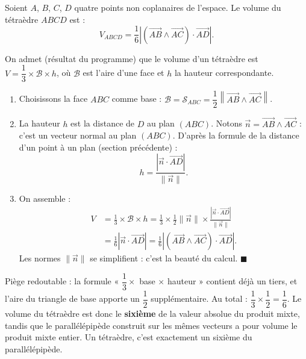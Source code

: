 \documentclass[11pt]{article}
\newcounter{popsec}
\newcounter{popsub}
\newcommand{\courssub}[1]{%
  \stepcounter{popsub}%
  \par\vspace{9pt}\noindent{\popxbold\fontsize{11.5}{13}\selectfont\color{popink}{\color{poporange}\thepopsec.\thepopsub}\hspace{6pt}#1}\par\nopagebreak\vspace{4pt}
}
\begin{document}
\courssub{Volume du tétraèdre}

\begin{propriete}
Soient $A$, $B$, $C$, $D$ quatre points non coplanaires de l'espace. Le volume du tétraèdre $ABCD$ est :
\[ V_{ABCD} = \frac{1}{6} \left| \left( \overrightarrow{AB} \wedge \overrightarrow{AC} \right) \cdot \overrightarrow{AD} \right|. \]
\end{propriete}

\begin{experience}[Démonstration guidée : $V = \dfrac{1}{3} \times \text{aire de base} \times \text{hauteur}$]
On admet (résultat du programme) que le volume d'un tétraèdre est $V = \dfrac{1}{3} \times \mathcal{B} \times h$, où $\mathcal{B}$ est l'aire d'une face et $h$ la hauteur correspondante.
\begin{enumerate}
\item Choisissons la face $ABC$ comme base : $\mathcal{B} = \mathcal{S}_{ABC} = \dfrac{1}{2} \left\| \overrightarrow{AB} \wedge \overrightarrow{AC} \right\|$.
\item La hauteur $h$ est la distance de $D$ au plan $(ABC)$. Notons $\vec{n} = \overrightarrow{AB} \wedge \overrightarrow{AC}$ : c'est un vecteur normal au plan $(ABC)$. D'après la formule de la distance d'un point à un plan (section précédente) :
\[ h = \frac{\left| \vec{n} \cdot \overrightarrow{AD} \right|}{\|\vec{n}\|}. \]
\item On assemble :
\begin{align*}
V &= \frac{1}{3} \times \mathcal{B} \times h = \frac{1}{3} \times \frac{1}{2}\|\vec{n}\| \times \frac{|\vec{n}\cdot\overrightarrow{AD}|}{\|\vec{n}\|} \\
&= \frac{1}{6} \left| \vec{n} \cdot \overrightarrow{AD} \right| = \frac{1}{6} \left| \left( \overrightarrow{AB} \wedge \overrightarrow{AC} \right) \cdot \overrightarrow{AD} \right|.
\end{align*}
Les normes $\|\vec{n}\|$ se simplifient : c'est la beauté du calcul. \hfill$\blacksquare$
\end{enumerate}
\end{experience}

\begin{attention}
Piège redoutable : la formule « $\dfrac{1}{3} \times$ base $\times$ hauteur » contient déjà un tiers, et l'aire du triangle de base apporte un $\dfrac{1}{2}$ supplémentaire. Au total : $\dfrac{1}{3} \times \dfrac{1}{2} = \dfrac{1}{6}$. Le volume du tétraèdre est donc le \textbf{sixième} de la valeur absolue du produit mixte, tandis que le parallélépipède construit sur les mêmes vecteurs a pour volume le produit mixte entier. Un tétraèdre, c'est exactement un sixième du parallélépipède.
\end{attention}
\end{document}
